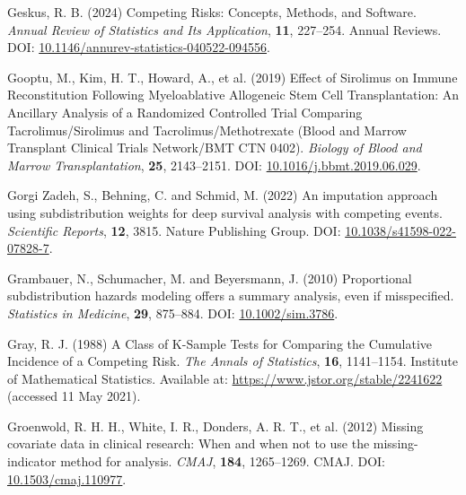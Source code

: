 \documentclass[
  letterpaper,
  paper=240mm:170mm,
  twoside=true,
  open=right,
  fontsize=10pt,
  pagesize=false,
  BCOR=15mm,
  DIV=14,
  headinclude=true,
  footinclude=false,
  headsepline=on]{scrbook}
\newlength{\cslhangindent}
\newenvironment{CSLReferences}[2] %
 {\begin{list}{}{%
  \setlength{\itemindent}{0pt}
  \setlength{\leftmargin}{0pt}
  \setlength{\parsep}{0pt}
  \ifodd #1
   \setlength{\leftmargin}{\cslhangindent}
   \setlength{\itemindent}{-1\cslhangindent}
  \fi
  \setlength{\itemsep}{#2\baselineskip}}}
 {\end{list}}
\begin{document}
\begin{CSLReferences}{1}{1}
Geskus, R. B. (2024) Competing {Risks}: {Concepts}, {Methods}, and
{Software}. \emph{Annual Review of Statistics and Its Application},
\textbf{11}, 227--254. Annual Reviews. DOI:
\href{https://doi.org/10.1146/annurev-statistics-040522-094556}{10.1146/annurev-statistics-040522-094556}.

Gooptu, M., Kim, H. T., Howard, A., et al. (2019) Effect of {Sirolimus}
on {Immune Reconstitution Following Myeloablative Allogeneic Stem Cell
Transplantation}: {An Ancillary Analysis} of a {Randomized Controlled
Trial Comparing Tacrolimus}/{Sirolimus} and {Tacrolimus}/{Methotrexate}
({Blood} and {Marrow Transplant Clinical Trials Network}/{BMT CTN}
0402). \emph{Biology of Blood and Marrow Transplantation}, \textbf{25},
2143--2151. DOI:
\href{https://doi.org/10.1016/j.bbmt.2019.06.029}{10.1016/j.bbmt.2019.06.029}.

Gorgi Zadeh, S., Behning, C. and Schmid, M. (2022) An imputation
approach using subdistribution weights for deep survival analysis with
competing events. \emph{Scientific Reports}, \textbf{12}, 3815. Nature
Publishing Group. DOI:
\href{https://doi.org/10.1038/s41598-022-07828-7}{10.1038/s41598-022-07828-7}.

Grambauer, N., Schumacher, M. and Beyersmann, J. (2010) Proportional
subdistribution hazards modeling offers a summary analysis, even if
misspecified. \emph{Statistics in Medicine}, \textbf{29}, 875--884. DOI:
\href{https://doi.org/10.1002/sim.3786}{10.1002/sim.3786}.

Gray, R. J. (1988) A {Class} of {K-Sample Tests} for {Comparing} the
{Cumulative Incidence} of a {Competing Risk}. \emph{The Annals of
Statistics}, \textbf{16}, 1141--1154. Institute of Mathematical
Statistics. Available at: \url{https://www.jstor.org/stable/2241622}
(accessed 11 May 2021).

Groenwold, R. H. H., White, I. R., Donders, A. R. T., et al. (2012)
Missing covariate data in clinical research: When and when not to use
the missing-indicator method for analysis. \emph{CMAJ}, \textbf{184},
1265--1269. CMAJ. DOI:
\href{https://doi.org/10.1503/cmaj.110977}{10.1503/cmaj.110977}.


\end{CSLReferences}
\end{document}
